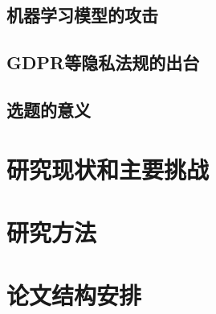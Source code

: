 \subsection{机器学习模型的攻击}

\subsection{GDPR等隐私法规的出台}

\subsection{选题的意义}

\section{研究现状和主要挑战}

\section{研究方法}

\section{论文结构安排}

